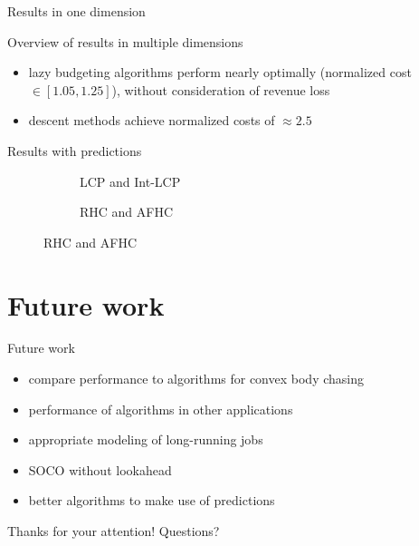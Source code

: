 \documentclass{beamer}
\begin{document}
\begin{frame}{Results in one dimension}
\begin{figure}
    \begin{subfigure}[b]{.38\linewidth}
    \resizebox{\textwidth}{!}{}
    \end{subfigure}\pause
    \begin{subfigure}[b]{.38\linewidth}
    \resizebox{\textwidth}{!}{}
    \end{subfigure}\pause
    \par\bigskip
    \begin{subfigure}[b]{.38\linewidth}
    \resizebox{\textwidth}{!}{}
    \end{subfigure}
\end{figure}
\end{frame}

\begin{frame}{Overview of results in multiple dimensions}
\begin{itemize}
    \item lazy budgeting algorithms perform nearly optimally (normalized cost $\in [1.05, 1.25]$), without consideration of revenue loss\pause
    \item descent methods achieve normalized costs of $\approx 2.5$
\end{itemize}
\end{frame}

\begin{frame}{Results with predictions}
\begin{figure}
    \begin{subfigure}[b]{.51\linewidth}
    \resizebox{\textwidth}{!}{}
    \caption{LCP and Int-LCP}
    \end{subfigure}\pause
    \begin{subfigure}[b]{.48\linewidth}
    \resizebox{\textwidth}{!}{}
    \caption{RHC and AFHC}
    \end{subfigure}
\end{figure}
\end{frame}

\section{Future work}

\begin{frame}{Future work}
\begin{itemize}
    \item compare performance to algorithms for convex body chasing\pause
    \item performance of algorithms in other applications\pause
    \item appropriate modeling of long-running jobs\pause
    \item SOCO without lookahead\pause
    \item better algorithms to make use of predictions
\end{itemize}
\end{frame}

\begin{frame}
\centering \large
Thanks for your attention!
Questions?
\end{frame}

\end{document}
